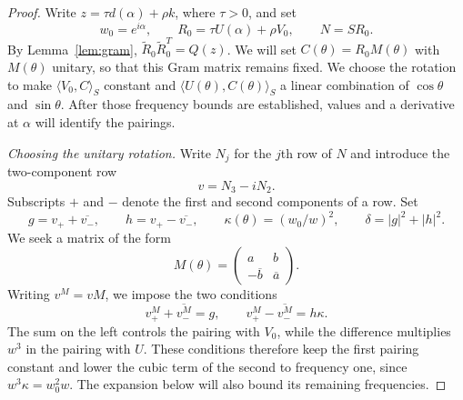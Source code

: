 \begin{proof}
Write $z=\tau d(\alpha)+\rho k$, where $\tau>0$, and set
\[
 w_0=e^{i\alpha},\qquad R_0=\tau U(\alpha)+\rho V_0,
 \qquad N=SR_0.
\]
By Lemma~\ref{lem:gram}, $\widetilde R_0\widetilde R_0^T=Q(z)$.
We will set $C(\theta)=R_0M(\theta)$ with $M(\theta)$ unitary, so
that this Gram matrix remains fixed.  We choose the rotation to make
$\langle V_0,C\rangle_S$ constant and
$\langle U(\theta),C(\theta)\rangle_S$ a linear combination of
$\cos\theta$ and $\sin\theta$.  After those frequency bounds are
established, values and a derivative at $\alpha$ will identify the
pairings.

\smallskip
\noindent\emph{Choosing the unitary rotation.}
Write $N_j$ for the $j$th row of $N$ and introduce the two-component row
\[
 v=N_3-iN_2.
\]
Subscripts $+$ and $-$ denote the first and second components of a row.
Set
\[
 g=v_++\overline{v_-},\qquad
 h=v_+-\overline{v_-},\qquad
 \kappa(\theta)=(w_0/w)^2,\qquad
 \delta=|g|^2+|h|^2.
\]
We seek a matrix of the form
\[
 M(\theta)=\begin{pmatrix}a&b\\-\overline b&\overline a\end{pmatrix}.
\]
Writing $v^M=vM$, we impose the two conditions
\begin{equation}\label{eq:rotation-pairings}
 v^M_++\overline{v^M_-}=g,
 \qquad
 v^M_+-\overline{v^M_-}=h\kappa.
\end{equation}
The sum on the left controls the pairing with $V_0$, while the difference
multiplies $w^3$ in the pairing with $U$.  These conditions therefore
keep the first pairing constant and lower the cubic term of the second
to frequency one, since $w^3\kappa=w_0^2w$.  The expansion below will
also bound its remaining frequencies.


\end{proof}
